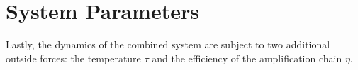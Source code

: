 


\section{System Parameters}
Lastly, the dynamics of the combined system are subject to two additional outside forces: the temperature $\tau$ and the efficiency of the amplification chain $\eta$.


